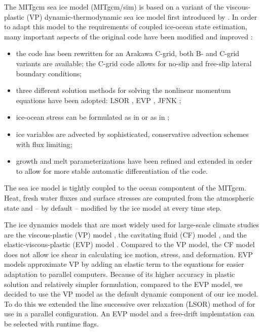 The MITgcm sea ice model (MITgcm/sim) is based on a variant of the
viscous-plastic (VP) dynamic-thermodynamic sea ice model \citep{zhang97}
first introduced by \citet{hib79, hib80}. In order to adapt this model
to the requirements of coupled ice-ocean state estimation, many
important aspects of the original code have been modified and
improved \citep{losch10:_mitsim}:
\begin{itemize}
\item the code has been rewritten for an Arakawa C-grid, both B- and
  C-grid variants are available; the C-grid code allows for no-slip
  and free-slip lateral boundary conditions;
\item three different solution methods for solving the nonlinear
  momentum equations have been adopted: LSOR \citep{zhang97}, EVP
  \citep{hun97}, JFNK \citep{lemieux10,losch14:_jfnk};
\item ice-ocean stress can be formulated as in \citet{hibler87} or as in
  \citet{cam08}; 
\item ice variables are advected by sophisticated, conservative
  advection schemes with flux limiting;
\item growth and melt parameterizations have been refined and extended
  in order to allow for more stable automatic differentiation of the code.
\end{itemize}
The sea ice model is tightly coupled to the ocean compontent of the
MITgcm.  Heat, fresh water fluxes and surface stresses are computed
from the atmospheric state and -- by default -- modified by the ice
model at every time step.

The ice dynamics models that are most widely used for large-scale
climate studies are the viscous-plastic (VP) model \citep{hib79}, the
cavitating fluid (CF) model \citep{fla92}, and the
elastic-viscous-plastic (EVP) model \citep{hun97}.  Compared to the VP
model, the CF model does not allow ice shear in calculating ice
motion, stress, and deformation.  EVP models approximate VP by adding
an elastic term to the equations for easier adaptation to parallel
computers.  Because of its higher accuracy in plastic solution and
relatively simpler formulation, compared to the EVP model, we decided
to use the VP model as the default dynamic component of our ice
model. To do this we extended the line successive over relaxation
(LSOR) method of \citet{zhang97} for use in a parallel
configuration. An EVP model and a free-drift implemtation can be
selected with runtime flags.

